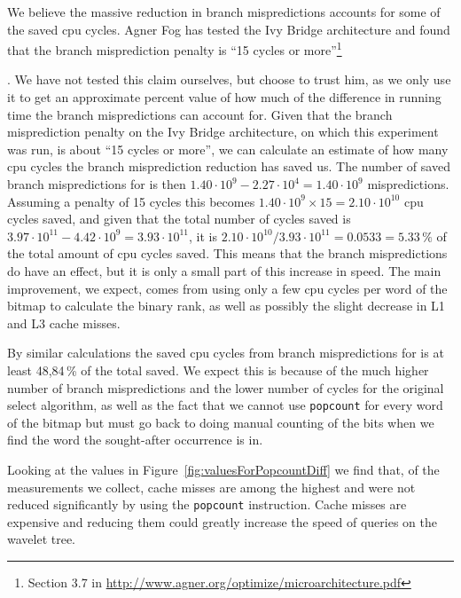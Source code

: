 We believe the massive reduction in branch mispredictions accounts for some of the saved cpu cycles.
Agner Fog has tested the Ivy Bridge architecture and found that the branch misprediction penalty is “15 cycles or more”\footnote{Section 3.7 in \url{http://www.agner.org/optimize/microarchitecture.pdf}}\addtocounter{footnote}{-1}\addtocounter{Hfootnote}{-1}.
We have not tested this claim ourselves, but choose to trust him, as we only use it to  get an approximate percent value of how much of the difference in running time the branch mispredictions can account for.
Given that the branch misprediction penalty on the Ivy Bridge architecture, on which this experiment was run, is about “15 cycles or more”\footnotemark, we can calculate an estimate of how many cpu cycles the branch misprediction reduction has saved us.
The number of saved branch mispredictions for  is then $1.40\cdot 10^9 - 2.27\cdot10^4 = 1.40\cdot10^9$ mispredictions. Assuming a penalty of 15 cycles this becomes $1.40\cdot10^9 \times 15 = 2.10\cdot10^{10}$ cpu cycles saved, and given that the total number of cycles saved is $3.97\cdot10^{11} - 4.42\cdot10^9 = 3.93\cdot10^{11}$, it is $2.10\cdot10^{10} / 3.93\cdot10^{11} = 0.0533 = 5.33\,\%$ of the total amount of cpu cycles saved.
This means that the branch mispredictions do have an effect, but it is only a small part of this increase in speed. The main improvement, we expect, comes from using only a few cpu cycles per word of the bitmap to calculate the binary rank, as well as possibly the slight decrease in L1 and L3 cache misses.



By similar calculations the saved cpu cycles from branch mispredictions for  is at least 48,84\,\% of the total saved. We expect this is because of the much higher number of branch mispredictions and the lower number of cycles for the original select algorithm, as well as the fact that we cannot use \texttt{popcount} for every word of the bitmap but must go back to doing manual counting of the bits when we find the word the sought-after occurrence is in.

Looking at the values in Figure~\ref{fig:valuesForPopcountDiff} we find that, of the measurements we collect, cache misses are among the highest and were not reduced significantly by using the \texttt{popcount} instruction.
Cache misses are expensive and reducing them could greatly increase the speed of queries on the wavelet tree.


